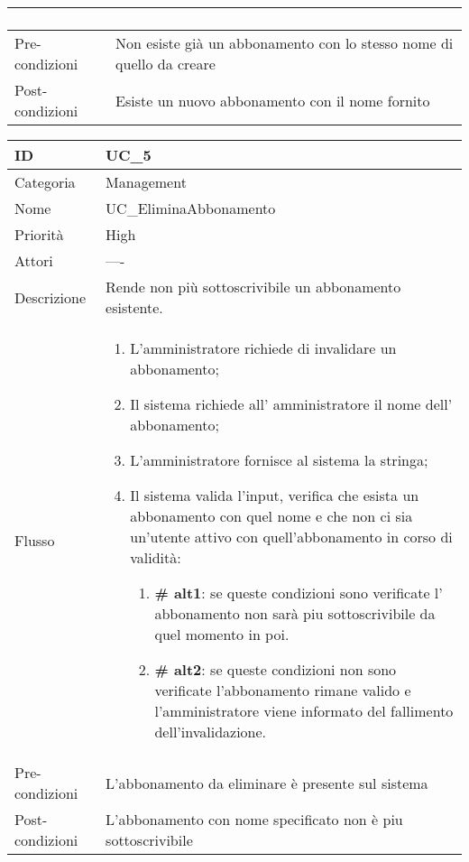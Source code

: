 \begin{center}
\begin{tabular}{ |p{2cm}|p{13cm}|  }
\begin{enumerate}
		\end{enumerate}\\\hline
Pre-condizioni &  Non esiste già un abbonamento con lo stesso nome di quello da creare\\\hline
Post-condizioni &  Esiste un nuovo abbonamento con il nome fornito\\\hline
\end{tabular}
\label{table_use_case:4}\newline

\begin{tabular}{ |p{2cm}|p{13cm}|  }
\hline
ID & UC\_5 \\\hline
Categoria & Management\\\hline
Nome & UC\_EliminaAbbonamento\\\hline
Priorità & High \\\hline
Attori &  ---- \\\hline
Descrizione & Rende non più sottoscrivibile un abbonamento esistente.\\\hline
Flusso &  	\begin{enumerate}
			\item L'amministratore richiede di invalidare un abbonamento;
			\item Il sistema richiede all' amministratore il nome dell' abbonamento;
			\item L'amministratore fornisce al sistema la stringa;
			\item Il sistema valida l'input, verifica che esista un abbonamento con quel nome e che non ci sia un'utente attivo con quell'abbonamento in corso di validità:
				\begin{enumerate}[  ]
					\item \textbf{\# alt1}: se queste condizioni sono verificate l' abbonamento non sarà piu sottoscrivibile da quel momento in poi.
					\item \textbf{\# alt2}: se queste condizioni non sono verificate l'abbonamento rimane valido e l'amministratore viene informato del fallimento dell'invalidazione.
				\end{enumerate}
		\end{enumerate}\\\hline
Pre-condizioni &  L'abbonamento da eliminare è presente sul sistema\\\hline
Post-condizioni &   L'abbonamento con nome specificato non è piu sottoscrivibile\\\hline
\end{tabular}
\label{table_use_case:5}\newline


\end{center}
